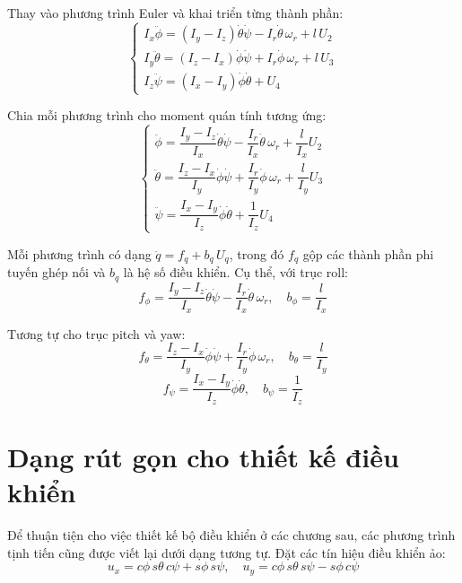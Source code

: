 \documentclass[12pt,a4paper]{report}
\begin{document}
Thay vào phương trình Euler và khai triển từng thành phần:
\begin{equation}
\begin{cases}
I_x \ddot{\phi} = (I_y - I_z) \dot{\theta} \dot{\psi} - I_r \dot{\theta} \, \omega_r + l \, U_2 \\[10pt]
I_y \ddot{\theta} = (I_z - I_x) \dot{\phi} \dot{\psi} + I_r \dot{\phi} \, \omega_r + l \, U_3 \\[10pt]
I_z \ddot{\psi} = (I_x - I_y) \dot{\phi} \dot{\theta} + U_4
\end{cases}
\end{equation}

Chia mỗi phương trình cho moment quán tính tương ứng:
\begin{equation}
\begin{cases}
\ddot{\phi} = \dfrac{I_y - I_z}{I_x} \dot{\theta} \dot{\psi} - \dfrac{I_r}{I_x} \dot{\theta} \, \omega_r + \dfrac{l}{I_x} U_2 \\[10pt]
\ddot{\theta} = \dfrac{I_z - I_x}{I_y} \dot{\phi} \dot{\psi} + \dfrac{I_r}{I_y} \dot{\phi} \, \omega_r + \dfrac{l}{I_y} U_3 \\[10pt]
\ddot{\psi} = \dfrac{I_x - I_y}{I_z} \dot{\phi} \dot{\theta} + \dfrac{1}{I_z} U_4
\end{cases}
\end{equation}

Mỗi phương trình có dạng $\ddot{q} = f_q + b_q \, U_q$, trong đó $f_q$ gộp các thành phần phi tuyến ghép nối và $b_q$ là hệ số điều khiển. Cụ thể, với trục roll:
\begin{equation}
f_\phi = \frac{I_y - I_z}{I_x} \dot{\theta} \dot{\psi} - \frac{I_r}{I_x} \dot{\theta} \, \omega_r, \quad b_\phi = \frac{l}{I_x}
\end{equation}

Tương tự cho trục pitch và yaw:
\begin{equation}
f_\theta = \frac{I_z - I_x}{I_y} \dot{\phi} \dot{\psi} + \frac{I_r}{I_y} \dot{\phi} \, \omega_r, \quad b_\theta = \frac{l}{I_y}
\end{equation}
\begin{equation}
f_\psi = \frac{I_x - I_y}{I_z} \dot{\phi} \dot{\theta}, \quad b_\psi = \frac{1}{I_z}
\end{equation}

\section{Dạng rút gọn cho thiết kế điều khiển}
Để thuận tiện cho việc thiết kế bộ điều khiển ở các chương sau, các phương trình tịnh tiến cũng được viết lại dưới dạng tương tự. Đặt các tín hiệu điều khiển ảo:
\begin{equation}
u_x = c\phi \, s\theta \, c\psi + s\phi \, s\psi, \quad u_y = c\phi \, s\theta \, s\psi - s\phi \, c\psi
\end{equation}
\end{document}
